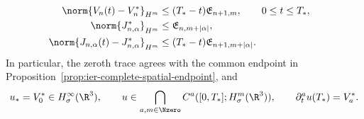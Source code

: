\begin{theorem}
\begin{align}
 \label{eq:ier-endpoint-velocity-size}\\
 \norm{V_n(t)-V_n^*}_{H^m}
 &\le(T_*-t)\mathfrak E_{n+1,m},
 \qquad0\le t\le T_*,
 \label{eq:ier-endpoint-velocity-modulus}\\
 \norm{J_{n,\alpha}^*}_{H^m}
 &\le\mathfrak E_{n,m+|\alpha|},
 \label{eq:ier-endpoint-mixed-size}\\
 \norm{J_{n,\alpha}(t)-J_{n,\alpha}^*}_{H^m}
 &\le(T_*-t)\mathfrak E_{n+1,m+|\alpha|}.
 \label{eq:ier-endpoint-mixed-modulus}
\end{align}
 In particular, the zeroth trace agrees with the common endpoint in
 Proposition~\ref{prop:ier-complete-spatial-endpoint}, and
\begin{equation}
 u_*=V_0^*\in H^\infty_\sigma(\R^3),
 \qquad
 u\in\bigcap_{a,m\in\Nzero}C^a([0,T_*];H^m_\sigma(\R^3)),
 \qquad
 \partial_t^au(T_*)=V_a^*.
 \label{eq:ier-complete-left-velocity-jet}
\end{equation}
\end{theorem}

